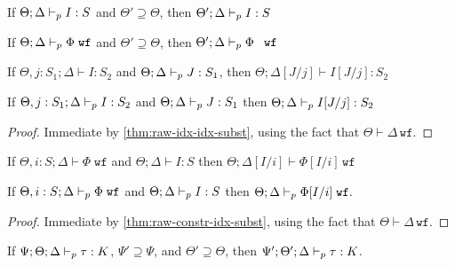 \begin{theorem}
If $\Theta ; \Delta \vdash_p I : S$ and $\Theta' \supseteq \Theta$, then $\Theta' ; \Delta \vdash_p I : S$
\end{theorem}

\begin{theorem}
If $\Theta ; \Delta \vdash_p \Phi \; \texttt{wf}$ and $\Theta' \supseteq \Theta$, then $\Theta' ; \Delta \vdash_p \Phi \; \texttt{ wf}$
\end{theorem}

\begin{theorem}
If $\Theta, j : S_1 ; \Delta \vdash I : S_2$ and $\Theta ; \Delta \vdash_p J : S_1$, then 
$\Theta ; \Delta[J/j] \vdash I[J/j] : S_2$
\label{thm:raw-idx-idx-subst}
\end{theorem}


\begin{theorem}
If $\Theta, j : S_1 ; \Delta \vdash_p I : S_2$ and $\Theta ; \Delta \vdash_p J : S_1$ then $\Theta ; \Delta \vdash_p I[J/j] : S_2$
\label{thm:idx-idx-subst}
\end{theorem}
\begin{proof}
Immediate by \autoref{thm:raw-idx-idx-subst}, using the fact that $\Theta \vdash \Delta \, \texttt{wf}$.
\end{proof}

\begin{theorem}
If $\Theta, i : S ; \Delta \vdash \Phi \; \texttt{wf}$ and $\Theta ; \Delta \vdash I : S$ then $\Theta ; \Delta[I/i] \vdash \Phi[I/i] \, \texttt{wf}$
\label{thm:raw-constr-idx-subst}
\end{theorem}


\begin{theorem}
If $\Theta, i : S ; \Delta \vdash_p \Phi \; \texttt{wf}$ and $\Theta ; \Delta \vdash_p I : S$ then $\Theta ; \Delta \vdash_p \Phi[I/i] \; \texttt{wf}.$
\label{thm:constr-idx-subst}
\end{theorem}
\begin{proof}
Immediate by \autoref{thm:raw-constr-idx-subst}, using the fact that $\Theta \vdash \Delta \, \texttt{wf}$.
\end{proof}


\begin{theorem}
If $\Psi ; \Theta ; \Delta \vdash_p \tau : K$, $\Psi' \supseteq \Psi$, and $\Theta' \supseteq \Theta$, then
$\Psi' ; \Theta' ; \Delta \vdash_p \tau : K$.
\end{theorem}

